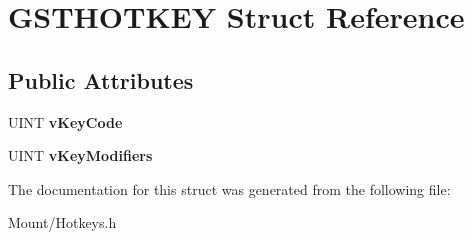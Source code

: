 \hypertarget{struct_g_s_t_h_o_t_k_e_y}{}\section{G\+S\+T\+H\+O\+T\+K\+EY Struct Reference}
\label{struct_g_s_t_h_o_t_k_e_y}
\subsection*{Public Attributes}
\begin{DoxyCompactItemize}
\item 
\mbox{\label{struct_g_s_t_h_o_t_k_e_y_aaddbcf6bfb1266defa9797434db2bc62}} 
U\+I\+NT {\bfseries v\+Key\+Code}
\item 
\mbox{\label{struct_g_s_t_h_o_t_k_e_y_a0eb4c510418bb14feae285760aaad44c}} 
U\+I\+NT {\bfseries v\+Key\+Modifiers}
\end{DoxyCompactItemize}


The documentation for this struct was generated from the following file\+:\begin{DoxyCompactItemize}
\item 
Mount/Hotkeys.\+h\end{DoxyCompactItemize}
